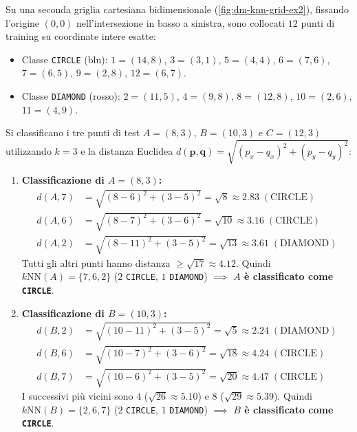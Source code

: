 Su una seconda griglia cartesiana bidimensionale (\autoref{fig:dm-knn-grid-ex2}), fissando l'origine $(0,0)$ nell'intersezione in basso a sinistra, sono collocati $12$ punti di training su coordinate intere esatte:
\begin{itemize}
    \item Classe \texttt{CIRCLE} (blu): $1=(14,8)$, $3=(3,1)$, $5=(4,4)$, $6=(7,6)$, $7=(6,5)$, $9=(2,8)$, $12=(6,7)$.
    \item Classe \texttt{DIAMOND} (rosso): $2=(11,5)$, $4=(9,8)$, $8=(12,8)$, $10=(2,6)$, $11=(4,9)$.
\end{itemize}
Si classificano i tre punti di test $A=(8,3)$, $B=(10,3)$ e $C=(12,3)$ utilizzando $k = 3$ e la distanza Euclidea $d(\mathbf{p}, \mathbf{q}) = \sqrt{(p_x - q_x)^2 + (p_y - q_y)^2}$:

\begin{enumerate}
    \item \textbf{Classificazione di $A = (8,3)$:}
    \begin{align*}
        d(A, 7) &= \sqrt{(8-6)^2 + (3-5)^2} = \sqrt{8} \approx 2.83 \; (\text{CIRCLE}) \\
        d(A, 6) &= \sqrt{(8-7)^2 + (3-6)^2} = \sqrt{10} \approx 3.16 \; (\text{CIRCLE}) \\
        d(A, 2) &= \sqrt{(8-11)^2 + (3-5)^2} = \sqrt{13} \approx 3.61 \; (\text{DIAMOND})
    \end{align*}
    Tutti gli altri punti hanno distanza $\ge \sqrt{17} \approx 4.12$. Quindi $k\text{NN}(A) = \{7, 6, 2\}$ ($2$ \texttt{CIRCLE}, $1$ \texttt{DIAMOND}) $\implies$ \textbf{$A$ \`e classificato come \texttt{CIRCLE}}.

    \item \textbf{Classificazione di $B = (10,3)$:}
    \begin{align*}
        d(B, 2) &= \sqrt{(10-11)^2 + (3-5)^2} = \sqrt{5} \approx 2.24 \; (\text{DIAMOND}) \\
        d(B, 6) &= \sqrt{(10-7)^2 + (3-6)^2} = \sqrt{18} \approx 4.24 \; (\text{CIRCLE}) \\
        d(B, 7) &= \sqrt{(10-6)^2 + (3-5)^2} = \sqrt{20} \approx 4.47 \; (\text{CIRCLE})
    \end{align*}
    I successivi pi\`u vicini sono $4$ ($\sqrt{26} \approx 5.10$) e $8$ ($\sqrt{29} \approx 5.39$). Quindi $k\text{NN}(B) = \{2, 6, 7\}$ ($2$ \texttt{CIRCLE}, $1$ \texttt{DIAMOND}) $\implies$ \textbf{$B$ \`e classificato come \texttt{CIRCLE}}.


\end{enumerate}
